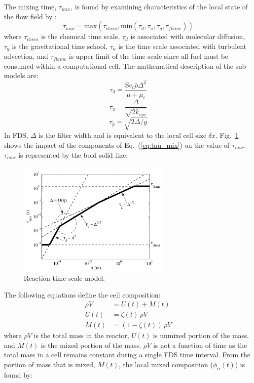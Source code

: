 The mixing time, $\tau_{mix}$, is found by examining characteristics of the local state of the flow field by \cite{McDermott:2011}:
\begin{equation}\label{eq:tau_mix}
\tau_{mix}=\mbox{max}(\tau_{chem},\mbox{min}(\tau_{d},\tau_{u},\tau_{g},\tau_{flame}))
\end{equation}
where $\tau_{chem}$ is the chemical time scale, $\tau_{d}$ is associated with molecular diffusion, $\tau_{g}$ is the gravitational time school, $\tau_{u}$ is the time scale associated with turbulent advection, and $\tau_{flame}$ is upper limit of the time scale since all fuel must be consumed within a computational cell. The mathematical description of the sub models are:
\begin{equation}\label{eq:tau_d}
\tau_{d}=\frac{\mbox{Sc}_{t}\bar{\rho}\Delta^2}{\mu+\mu_{t}}
\end{equation}
\begin{equation}\label{eq:tau_u}
\tau_{u}=\frac{\Delta}{\sqrt{2k_{sgs}}}
\end{equation}
\begin{equation}\label{eq:tau_g}
\tau_{g}=\sqrt{2\Delta/g}
\end{equation}
In FDS, $\Delta$ is the filter width and is equivalent to the local cell size $\delta x$. Fig.~\ref{fig:reac_time_scale} shows the impact of the components of Eq.~(\ref{eq:tau_mix}) on the value of $\tau_{mix}$. $\tau_{mix}$ is represented by the bold solid line.

\begin{figure}[h!]
\begin{center}
\includegraphics[height=2.2in]{FIGURES/reaction_time_scale}
\caption{\label{fig:reac_time_scale} Reaction time scale model.}
\end{center}
\end{figure}

The following equations define the cell composition:
\begin{eqnarray}\label{eq:mixunmix}
\rho V &= U(t) + M(t) \\
U(t) &= \zeta(t)\,\rho V \\
M(t) &= (1-\zeta(t))\,\rho V
\end{eqnarray} 
where $\rho V$ is the total mass in the reactor, $U(t)$ is unmixed portion of the mass, and $M(t)$ is the mixed portion of the mass. $\rho V$ is not a function of time as the total mass in a cell remains constant during a single FDS time interval. From the portion of mass that is mixed, $M(t)$, the local mixed composition ($\phi_{\alpha}(t)$) is found by:

